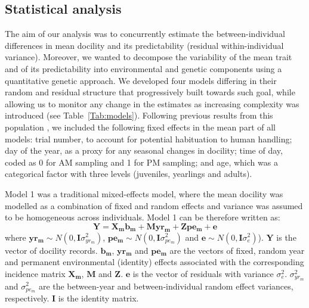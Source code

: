 \documentclass[a4paper,12pt,twoside]{article}
\begin{document}
	\subsection*{Statistical analysis}
	The aim of our analysis was to concurrently estimate the between-individual differences in mean docility and its predictability (residual within-individual variance). 
	Moreover, we wanted to decompose the variability of the mean trait and of its predictability into environmental and genetic components using a quantitative genetic approach. 
	We developed four models differing in their random and residual structure that progressively built towards such goal, while allowing us to monitor any change in the estimates as increasing complexity was introduced (see Table~\ref{Tab:models}). 
	Following previous results from this population \citep{Petelle2013, Petelle2015}, we included the following fixed effects in the mean part of all models: trial number, to account for potential habituation to human handling; day of the year, as a proxy for any seasonal changes in docility; time of day, coded as 0 for AM sampling and 1 for PM sampling; and age, which was a categorical factor with three levels (juveniles, yearlings and adults).
	
	Model 1 was a traditional mixed-effects model, where the mean docility was modelled as a combination of fixed and random effects and variance was assumed to be homogeneous across individuals. 
	Model 1 can be therefore written as:
	\begin{equation}\label{Eq:mm}
	\boldsymbol{Y} = \boldsymbol{X_m b_m} + \boldsymbol{M yr_m} + \boldsymbol{Z pe_m} + \boldsymbol{e}
	\end{equation}
	where $\boldsymbol{yr_m} \sim N(0, \boldsymbol{I}\sigma_{yr_m}^2)$, $\boldsymbol{pe_m} \sim N(0, \boldsymbol{I}\sigma_{pe_m}^2)$ and $\boldsymbol{e} \sim N(0, \boldsymbol{I}\sigma_e^2)$).
	$\boldsymbol{Y}$ is the vector of docility records. 
	$\boldsymbol{b_m}$, $\boldsymbol{yr_m}$ and $\boldsymbol{pe_m}$ are the vectors of fixed, random year and permanent environmental (identity) effects associated with the corresponding incidence matrix $\boldsymbol{X_m}$, $\boldsymbol{M}$ and $\boldsymbol{Z}$. 
	$\boldsymbol{e}$ is the vector of residuals with variance $\sigma_e^2$. 
	$\sigma_{yr_m}^2$ and $\sigma_{pe_m}^2$ are the between-year and between-individual random effect variances, respectively. 
	$\boldsymbol{I}$ is the identity matrix. 
	
\end{document}

